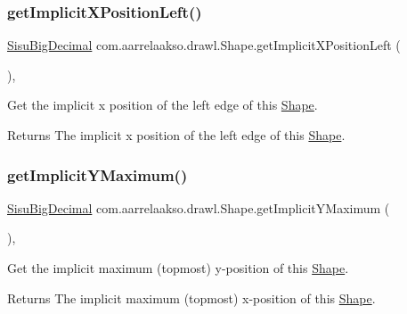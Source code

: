 \subsubsection{\texorpdfstring{get\+Implicit\+X\+Position\+Left()}{getImplicitXPositionLeft()}}
{\footnotesize\ttfamily \hyperlink{classcom_1_1aarrelaakso_1_1drawl_1_1_sisu_big_decimal}{Sisu\+Big\+Decimal} com.\+aarrelaakso.\+drawl.\+Shape.\+get\+Implicit\+X\+Position\+Left (\begin{DoxyParamCaption}{ }\end{DoxyParamCaption})\hspace{0.3cm}{\ttfamily [protected]}, {\ttfamily [inherited]}}

Get the implicit x position of the left edge of this \hyperlink{classcom_1_1aarrelaakso_1_1drawl_1_1_shape}{Shape}.

\begin{DoxyReturn}{Returns}
The implicit x position of the left edge of this \hyperlink{classcom_1_1aarrelaakso_1_1drawl_1_1_shape}{Shape}. 
\end{DoxyReturn}
\mbox{\label{classcom_1_1aarrelaakso_1_1drawl_1_1_shape_a7a4579f2966a3d5ebbfa46b5b2528f9d}} 
\subsubsection{\texorpdfstring{get\+Implicit\+Y\+Maximum()}{getImplicitYMaximum()}}
{\footnotesize\ttfamily \hyperlink{classcom_1_1aarrelaakso_1_1drawl_1_1_sisu_big_decimal}{Sisu\+Big\+Decimal} com.\+aarrelaakso.\+drawl.\+Shape.\+get\+Implicit\+Y\+Maximum (\begin{DoxyParamCaption}{ }\end{DoxyParamCaption})\hspace{0.3cm}{\ttfamily [protected]}, {\ttfamily [inherited]}}

Get the implicit maximum (topmost) y-\/position of this \hyperlink{classcom_1_1aarrelaakso_1_1drawl_1_1_shape}{Shape}.

\begin{DoxyReturn}{Returns}
The implicit maximum (topmost) x-\/position of this \hyperlink{classcom_1_1aarrelaakso_1_1drawl_1_1_shape}{Shape}. 
\end{DoxyReturn}
\mbox{\label{classcom_1_1aarrelaakso_1_1drawl_1_1_shape_aa0877965f7f172378e87ba69f27c7ad6}} 
